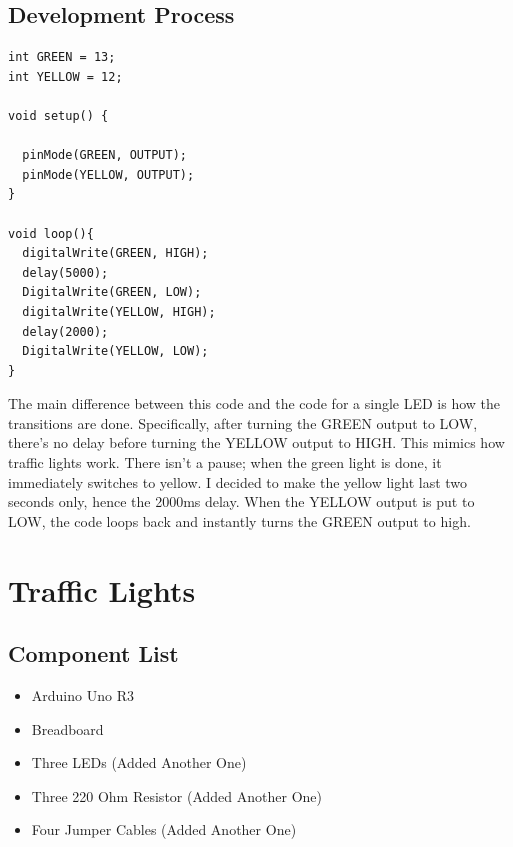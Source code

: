 \documentclass[12pt]{article}
\begin{document}
\subsection{Development Process}
\begin{tcolorbox}[
    enhanced,
    attach boxed title to top left={xshift=6mm,yshift=-3mm},
    colback=lightgreen!20,
    colframe=lightgreen,
    colbacktitle=lightgreen,
    title=Code for Two LEDs,
    fonttitle=\bfseries\color{black},
    boxed title style={size=small,colframe=lightgreen,sharp corners},
    sharp corners,
]
\begin{verbatim}
int GREEN = 13;
int YELLOW = 12;

void setup() {
 
  pinMode(GREEN, OUTPUT);
  pinMode(YELLOW, OUTPUT);
}

void loop(){
  digitalWrite(GREEN, HIGH);
  delay(5000);
  DigitalWrite(GREEN, LOW);
  digitalWrite(YELLOW, HIGH);
  delay(2000);
  DigitalWrite(YELLOW, LOW);
}
\end{verbatim}
\end{tcolorbox}
The main difference between this code and the code for a single LED is how the transitions are done. Specifically, after turning the GREEN output to LOW, there's no delay
before turning the YELLOW output to HIGH. This mimics how traffic lights work. There isn't a pause; when the green light is done, it immediately switches to yellow. 
I decided to make the yellow light last two seconds only, hence the 2000ms delay. When the YELLOW output is put to LOW, the code loops back and instantly turns the GREEN 
output to high.

\section{Traffic Lights}

\subsection{Component List}

\begin{itemize}
\item Arduino Uno R3
\item Breadboard
\item Three LEDs (Added Another One)
\item Three 220 Ohm Resistor (Added Another One)
\item Four Jumper Cables (Added Another One)
\end{itemize}
\end{document}
